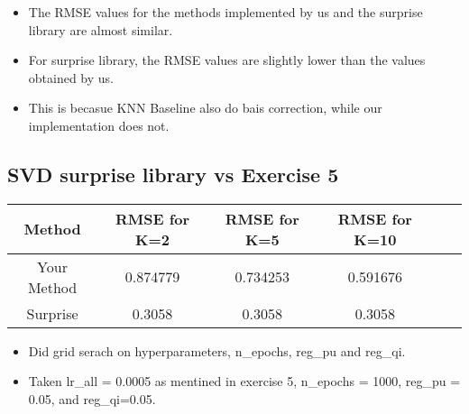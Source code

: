 \documentclass[12pt]{article}
\begin{document}
\begin{itemize}
    \item The RMSE values for the methods implemented by us and the surprise library are almost similar.
    \item For surprise library, the RMSE values are slightly lower than the values obtained by us.
    \item This is becasue KNN Baseline also do bais correction, while our implementation does not.
\end{itemize}

\subsection*{SVD surprise library vs Exercise 5}

\begin{center}
    \begin{tabular}{|c|c|c|c|c|c|}
    \hline
    Method & RMSE for K=2 &RMSE for K=5 & RMSE for K=10\\
    \hline
    Your Method & 0.874779 & 0.734253 & 0.591676 \\
    \hline
    Surprise & 0.3058  & 0.3058  & 0.3058  \\
    \hline
    
\end{tabular}
\end{center}

\begin{itemize}
    \item Did grid serach on hyperparameters, n\_epochs, reg\_pu and reg\_qi.
    \item Taken lr\_all = 0.0005 as mentined in exercise 5, n\_epochs = 1000, reg\_pu = 0.05, and reg\_qi=0.05.
\end{itemize}
\end{document}
